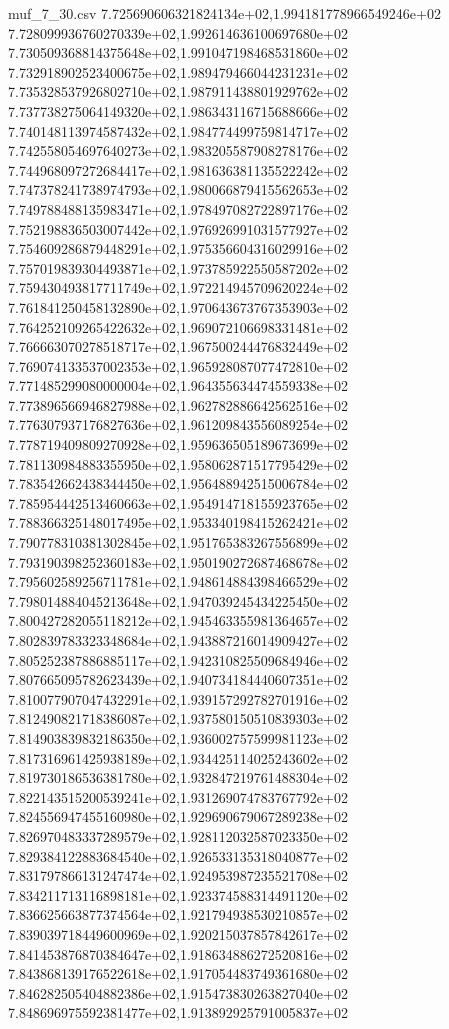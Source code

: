 \begin{filecontents*}{muf_7_30.csv}
7.725690606321824134e+02,1.994181778966549246e+02
7.728099936760270339e+02,1.992614636100697680e+02
7.730509368814375648e+02,1.991047198468531860e+02
7.732918902523400675e+02,1.989479466044231231e+02
7.735328537926802710e+02,1.987911438801929762e+02
7.737738275064149320e+02,1.986343116715688666e+02
7.740148113974587432e+02,1.984774499759814717e+02
7.742558054697640273e+02,1.983205587908278176e+02
7.744968097272684417e+02,1.981636381135522242e+02
7.747378241738974793e+02,1.980066879415562653e+02
7.749788488135983471e+02,1.978497082722897176e+02
7.752198836503007442e+02,1.976926991031577927e+02
7.754609286879448291e+02,1.975356604316029916e+02
7.757019839304493871e+02,1.973785922550587202e+02
7.759430493817711749e+02,1.972214945709620224e+02
7.761841250458132890e+02,1.970643673767353903e+02
7.764252109265422632e+02,1.969072106698331481e+02
7.766663070278518717e+02,1.967500244476832449e+02
7.769074133537002353e+02,1.965928087077472810e+02
7.771485299080000004e+02,1.964355634474559338e+02
7.773896566946827988e+02,1.962782886642562516e+02
7.776307937176827636e+02,1.961209843556089254e+02
7.778719409809270928e+02,1.959636505189673699e+02
7.781130984883355950e+02,1.958062871517795429e+02
7.783542662438344450e+02,1.956488942515006784e+02
7.785954442513460663e+02,1.954914718155923765e+02
7.788366325148017495e+02,1.953340198415262421e+02
7.790778310381302845e+02,1.951765383267556899e+02
7.793190398252360183e+02,1.950190272687468678e+02
7.795602589256711781e+02,1.948614884398466529e+02
7.798014884045213648e+02,1.947039245434225450e+02
7.800427282055118212e+02,1.945463355981364657e+02
7.802839783323348684e+02,1.943887216014909427e+02
7.805252387886885117e+02,1.942310825509684946e+02
7.807665095782623439e+02,1.940734184440607351e+02
7.810077907047432291e+02,1.939157292782701916e+02
7.812490821718386087e+02,1.937580150510839303e+02
7.814903839832186350e+02,1.936002757599981123e+02
7.817316961425938189e+02,1.934425114025243602e+02
7.819730186536381780e+02,1.932847219761488304e+02
7.822143515200539241e+02,1.931269074783767792e+02
7.824556947455160980e+02,1.929690679067289238e+02
7.826970483337289579e+02,1.928112032587023350e+02
7.829384122883684540e+02,1.926533135318040877e+02
7.831797866131247474e+02,1.924953987235521708e+02
7.834211713116898181e+02,1.923374588314491120e+02
7.836625663877374564e+02,1.921794938530210857e+02
7.839039718449600969e+02,1.920215037857842617e+02
7.841453876870384647e+02,1.918634886272520816e+02
7.843868139176522618e+02,1.917054483749361680e+02
7.846282505404882386e+02,1.915473830263827040e+02
7.848696975592381477e+02,1.913892925791005837e+02

\end{filecontents*}

